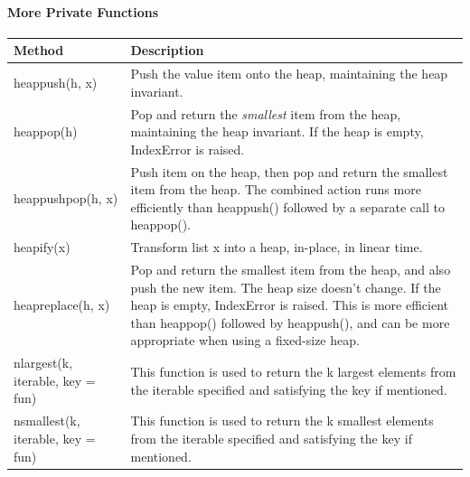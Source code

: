 \documentclass[main.tex]{subfiles}
\begin{document}
\paragraph{More Private Functions}
\begin{table}[h]
\begin{small}
\centering
\noindent{}
 \noindent \begin{tabular}{|p{}|p{}| }
  \hline
Method & Description   \\ \hline
heappush(h, x)  &  Push the value item onto the heap, maintaining the heap invariant.  \\\hline
heappop(h)  &Pop and return the \textit{smallest} item from the heap, maintaining the heap invariant. If the heap is empty, IndexError is raised.\\ \hline
heappushpop(h, x)  &Push item on the heap, then pop and return the smallest item from the heap. The combined action runs more efficiently than heappush() followed by a separate call to heappop().\\ \hline
heapify(x) & Transform list x into a heap, in-place, in linear time.\\ \hline
heapreplace(h, x) & Pop and return the smallest item from the heap, and also push the new item. The heap size doesn’t change. If the heap is empty, IndexError is raised. This is more efficient than heappop() followed by heappush(), and can be more appropriate when using a fixed-size heap.\\ \hline
nlargest(k, iterable, key = fun) & This function is used to return the k largest elements from the iterable specified and satisfying the key if mentioned. \\ \hline
nsmallest(k, iterable, key = fun) & This function is used to return the k smallest elements from the iterable specified and satisfying the key if mentioned. \\ \hline
\end{tabular}
  \label{tab:functions_in_heapq}
  \end{small}
\end{table} 
\end{document}
